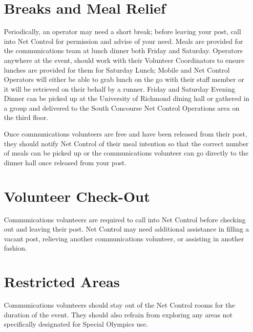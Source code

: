 \documentclass[pdflatex,letterpaper,twoside,12pt]{book}
\begin{document}
\section{Breaks and Meal Relief}

Periodically, an operator may need a short break; before leaving your post, call into Net Control for permission and advise of your need.  Meals are provided for the communications team at lunch dinner both Friday and Saturday.  Operators anywhere at the event, should work with their Volunteer Coordinators to ensure lunches are provided for them for Saturday Lunch; Mobile and Net Control Operators will either be able to grab lunch on the go with their staff member or it will be retrieved on their behalf by a runner.  Friday and Saturday Evening Dinner can be picked up at the University of Richmond dining hall or gathered in a group and delivered to the South Concourse Net Control Operations area on the third floor.

Once communications volunteers are free and have been released from their post, they should notify Net Control of their meal intention so that the correct number of meals can be picked up or the communications volunteer can go directly to the dinner hall once released from your post.


\section{Volunteer Check-Out}

Communications volunteers are required to call into Net Control before checking out and leaving their post. Net Control may need additional assistance in filling a vacant post, relieving another communications volunteer, or assisting in another fashion.


\section{Restricted Areas}

Communications volunteers should stay out of the Net Control rooms for the duration of the event. They should also refrain from exploring any areas not specifically designated for Special Olympics use.
\end{document}
